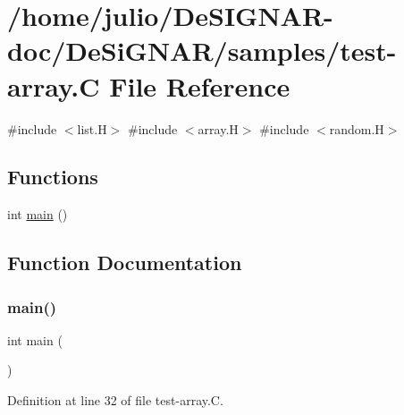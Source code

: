 \hypertarget{test-array_8_c}{}\section{/home/julio/\+De\+S\+I\+G\+N\+A\+R-\/doc/\+De\+Si\+G\+N\+A\+R/samples/test-\/array.C File Reference}
\label{test-array_8_c}
{\ttfamily \#include $<$list.\+H$>$}\newline
{\ttfamily \#include $<$array.\+H$>$}\newline
{\ttfamily \#include $<$random.\+H$>$}\newline
\subsection*{Functions}
\begin{DoxyCompactItemize}
\item 
int \hyperlink{test-array_8_c_ae66f6b31b5ad750f1fe042a706a4e3d4}{main} ()
\end{DoxyCompactItemize}


\subsection{Function Documentation}
\mbox{\label{test-array_8_c_ae66f6b31b5ad750f1fe042a706a4e3d4}} 
\subsubsection{\texorpdfstring{main()}{main()}}
{\footnotesize\ttfamily int main (\begin{DoxyParamCaption}{ }\end{DoxyParamCaption})}



Definition at line 32 of file test-\/array.\+C.

